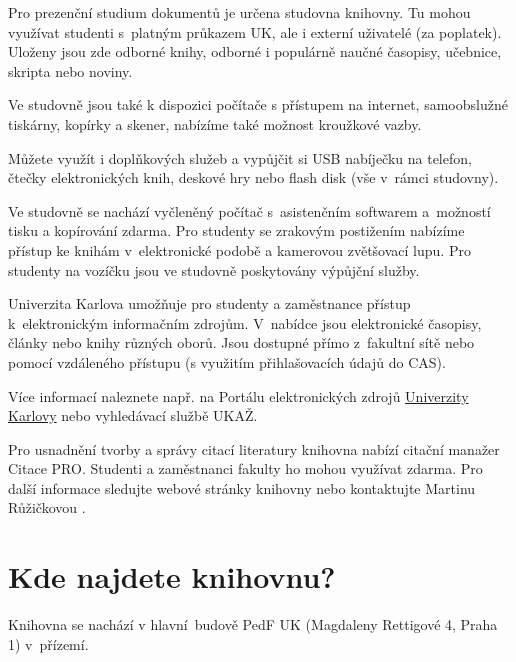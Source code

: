 Pro prezenční studium dokumentů je určena studovna knihovny. Tu mohou
využívat studenti s~platným průkazem UK, ale i externí uživatelé (za
poplatek). Uloženy jsou zde odborné knihy, odborné i populárně naučné
časopisy, učebnice, skripta nebo noviny.

Ve studovně jsou také k dispozici počítače s přístupem na internet,
samoobslužné tiskárny, kopírky a skener, nabízíme také možnost kroužkové
vazby.

Můžete využít i doplňkových služeb a vypůjčit si USB nabíječku na
telefon, čtečky elektronických knih, deskové hry nebo flash disk (vše
v~rámci studovny).



Ve studovně se nachází vyčleněný počítač s~asistenčním softwarem
a~možností tisku a kopírování zdarma. Pro studenty se zrakovým
postižením nabízíme přístup ke knihám v~elektronické podobě a kamerovou
zvětšovací lupu. Pro studenty na vozíčku jsou ve studovně poskytovány výpůjční
služby.


Univerzita Karlova umožňuje pro studenty a zaměstnance přístup
k~elektronickým informačním zdrojům. V~nabídce jsou elektronické
časopisy, články nebo knihy různých oborů. Jsou dostupné přímo
z~fakultní sítě nebo pomocí vzdáleného přístupu (s využitím
přihlašovacích údajů do CAS).

Více informací naleznete např. na Portálu elektronických zdrojů
{\href{http://pez.cuni.cz}{Univerzity Karlovy}} nebo vyhledávací
službě UKAŽ.


Pro usnadnění tvorby a správy citací literatury knihovna nabízí citační
manažer Citace PRO. Studenti a zaměstnanci fakulty ho mohou využívat
zdarma. Pro další informace sledujte webové stránky knihovny nebo
kontaktujte Martinu Růžičkovou
.

\section{Kde najdete knihovnu?}

Knihovna se nachází v hlavní~budově PedF UK (Magdaleny Rettigové 4,
Praha 1) v~přízemí.

